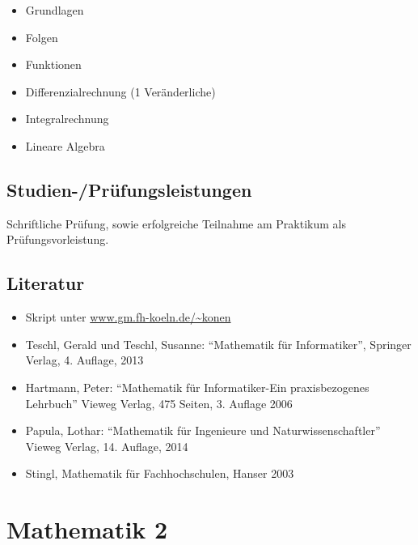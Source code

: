 \begin{itemize}
\tightlist
\item
  Grundlagen
\item
  Folgen
\item
  Funktionen
\item
  Differenzialrechnung (1 Veränderliche)
\item
  Integralrechnung
\item
  Lineare Algebra
\end{itemize}

\section*{Studien-/Prüfungsleistungen\label{/mi-2017/modulbeschreibungen-bachelor/BA_Mathematik1}}\label{studien-pruxfcfungsleistungenpathlabelmi-2017modulbeschreibungen-bachelorbaux5fmathematik1}

Schriftliche Prüfung, sowie erfolgreiche Teilnahme am Praktikum als
Prüfungsvorleistung.

\section*{Literatur\label{/mi-2017/modulbeschreibungen-bachelor/BA_Mathematik1}}\label{literaturpathlabelmi-2017modulbeschreibungen-bachelorbaux5fmathematik1}

\begin{itemize}
\tightlist
\item
  Skript unter
  \href{http://www.gm.fh-koeln.de/~konen}{www.gm.fh-koeln.de/\textasciitilde{}konen}
\item
  Teschl, Gerald und Teschl, Susanne: ``Mathematik für Informatiker'',
  Springer Verlag, 4. Auflage, 2013
\item
  Hartmann, Peter: ``Mathematik für Informatiker-Ein praxisbezogenes
  Lehrbuch'' Vieweg Verlag, 475 Seiten, 3. Auflage 2006
\item
  Papula, Lothar: ``Mathematik für Ingenieure und Naturwissenschaftler''
  Vieweg Verlag, 14. Auflage, 2014
\item
  Stingl, Mathematik für Fachhochschulen, Hanser 2003
\end{itemize}

\chapter{Mathematik
2\label{/mi-2017/modulbeschreibungen-bachelor/BA_Mathematik2}}\label{mathematik-2pathlabelmi-2017modulbeschreibungen-bachelorbaux5fmathematik2}

